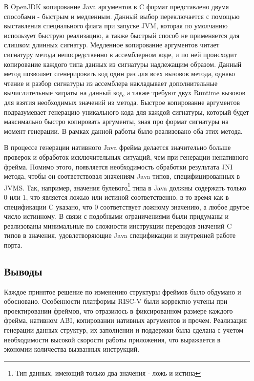 В OpenJDK копирование Java аргументов в C формат представлено двумя способами - быстрым и медленным. Данный выбор переключается с помощью выставления специального флага при запуске JVM, которая по умолчанию использует быструю реализацию, а также быстрый способ не применяется для слишком длинных сигнатур. Медленное копирование аргументов читает сигнатуру метода непосредственно в ассемблерном коде, и по ней происходит копирование каждого типа данных из сигнатуры надлежащим образом. Данный метод позволяет сгенерировать код один раз для всех вызовов метода, однако чтение и разбор сигнатуры из ассемблера накладывает дополнительные вычислительные затраты на данный код, а также требуют двух Runtime вызовов для взятия необходимых значений из метода. Быстрое копирование аргументов подразумевает генерацию уникального кода для каждой сигнатуры, который будет максимально быстро копировать аргументы, зная про формат сигнатуры на момент генерации. В рамках данной работы было реализовано оба этих метода.

В процессе генерации нативного Java фрейма делается значительно больше проверок и обработок исключительных ситуаций, чем при генерации ненативного фрейма. Помимо этого, появляется необходимость обработки результата JNI метода, чтобы он соответствовал значениям Java типов, специфицированных в JVMS. Так, например, значения булевого\footnote{Тип данных, имеющий только два значения - ложь и истина} типа в Java должны содержать только $0$ или $1$, что является ложью или истиной соответственно, в то время как в спецификации C указано, что $0$ соответствует ложному значению, а любое другое число истинному. В связи с подобными ограничениями были придуманы и реализованы минимальные по сложности инструкции переводов значений C типов в значения, удовлетворяющие Java спецификации и внутренней работе порта.


\subsection{Выводы}

Каждое принятое решение по изменению структуры фреймов было обдумано и обосновано. Особенности платформы RISC-V были корректно учтены при проектировании фреймов, что отразилось в фиксированном размере каждого фрейма, нативном ABI, копировании нативных аргументов и прочем. Реализация генерации данных структур, их заполнении и поддержки была сделана с учетом необходимости высокой скорости работы приложения, что выражается в экономии количества вызванных инструкций.
